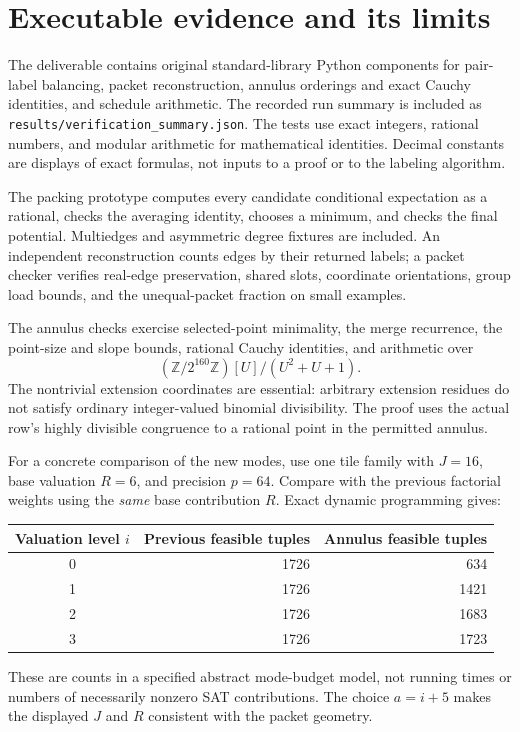 \documentclass[11pt,letterpaper]{article}
\theoremstyle{remark}\newtheorem{remark}[theorem]{Remark}
\begin{document}
\section{Executable evidence and its limits}
\label{sec:checks}
The deliverable contains original standard-library Python components for
pair-label balancing, packet reconstruction, annulus orderings and exact
Cauchy identities, and schedule arithmetic. The recorded run summary is
included as \texttt{results/verification\_summary.json}. The tests use
exact integers, rational numbers, and modular arithmetic for mathematical
identities. Decimal constants are displays of exact formulas, not inputs
to a proof or to the labeling algorithm.

The packing prototype computes every candidate conditional expectation
as a rational, checks the averaging identity, chooses a minimum, and
checks the final potential. Multiedges and asymmetric degree fixtures
are included. An independent reconstruction counts edges by their
returned labels; a packet checker verifies real-edge preservation,
shared slots, coordinate orientations, group load bounds, and the
unequal-packet fraction on small examples.

The annulus checks exercise selected-point minimality, the merge
recurrence, the point-size and slope bounds, rational Cauchy identities,
and arithmetic over
\[
 (\mathbb Z/2^{160}\mathbb Z)[U]/(U^2+U+1).
\]
The nontrivial extension coordinates are essential: arbitrary extension
residues do not satisfy ordinary integer-valued binomial divisibility.
The proof uses the actual row's highly divisible congruence to a rational
point in the permitted annulus.

For a concrete comparison of the new modes, use one tile family with
$J=16$, base valuation $R=6$, and precision $p=64$. Compare with the
previous factorial weights using the \emph{same} base contribution $R$.
Exact dynamic programming gives:
\begin{center}
\begin{tabular}{@{}crr@{}}
\toprule
Valuation level $i$ & Previous feasible tuples & Annulus feasible tuples\\
\midrule
0 & 1726 & 634\\
1 & 1726 & 1421\\
2 & 1726 & 1683\\
3 & 1726 & 1723\\
\bottomrule
\end{tabular}
\end{center}
These are counts in a specified abstract mode-budget model, not running
times or numbers of necessarily nonzero SAT contributions. The choice
$a=i+5$ makes the displayed $J$ and $R$ consistent with the packet geometry.
\end{document}
